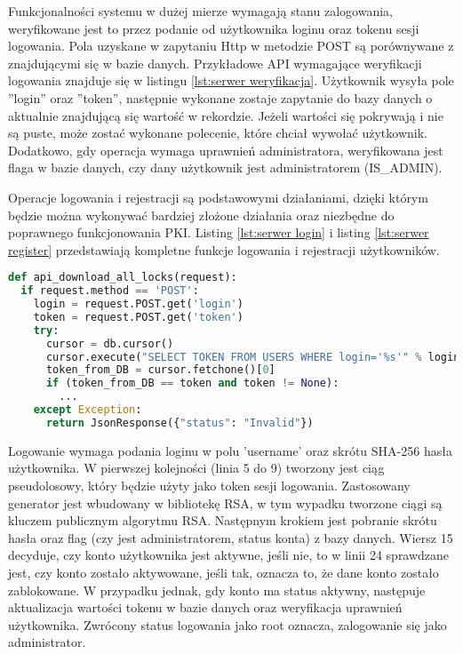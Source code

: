 	Funkcjonalności systemu w  dużej mierze wymagają stanu zalogowania, weryfikowane jest to przez podanie od użytkownika loginu oraz tokenu sesji logowania. Pola uzyskane w zapytaniu Http w metodzie POST są porównywane z znajdującymi się w bazie danych. Przykładowe API wymagające weryfikacji logowania znajduje się w listingu \ref{lst:serwer weryfikacja}. Użytkownik wysyła pole ''login'' oraz ''token'', następnie wykonane zostaje zapytanie do bazy danych o aktualnie znajdującą się wartość w rekordzie. Jeżeli wartości się pokrywają i nie są puste, może zostać wykonane polecenie, które chciał wywołać użytkownik. Dodatkowo, gdy operacja wymaga uprawnień administratora, weryfikowana jest flaga w bazie danych, czy dany użytkownik jest administratorem (IS\_ADMIN).
	
	Operacje logowania i rejestracji są podstawowymi działaniami, dzięki którym będzie można wykonywać bardziej złożone działania oraz niezbędne do poprawnego funkcjonowania PKI. Listing \ref{lst:serwer login} i listing \ref{lst:serwer register} przedstawiają kompletne funkcje logowania i rejestracji użytkowników. 
\newpage	
	{\footnotesize 
	\begin{lstlisting}[caption={Przykładowe API weryfikujące stan logowania}, label={lst:serwer weryfikacja}, language=Python]
def api_download_all_locks(request):
  if request.method == 'POST':
    login = request.POST.get('login')
    token = request.POST.get('token')
    try:
      cursor = db.cursor()
      cursor.execute("SELECT TOKEN FROM USERS WHERE login='%s'" % login)
      token_from_DB = cursor.fetchone()[0]
      if (token_from_DB == token and token != None):
        ...
    except Exception:
      return JsonResponse({"status": "Invalid"})
	\end{lstlisting}}

	Logowanie wymaga podania loginu w polu 'username' oraz skrótu SHA-256 hasła użytkownika. W pierwszej kolejności (linia 5 do 9) tworzony jest ciąg pseudolosowy, który będzie użyty jako token sesji logowania. Zastosowany generator jest wbudowany w bibliotekę RSA, w tym wypadku tworzone ciągi są kluczem publicznym algorytmu RSA. Następnym krokiem jest pobranie skrótu hasła oraz flag (czy jest administratorem, status konta) z bazy danych. Wiersz 15 decyduje, czy konto użytkownika jest aktywne, jeśli nie, to w linii 24 sprawdzane jest, czy konto zostało aktywowane, jeśli tak, oznacza to, że dane konto zostało zablokowane. W przypadku jednak, gdy konto ma status aktywny, następuje aktualizacja wartości tokenu w bazie danych oraz weryfikacja uprawnień użytkownika. Zwrócony status logowania jako root oznacza, zalogowanie się jako administrator.
	
